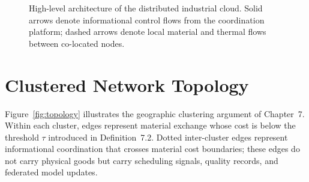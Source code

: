 \documentclass[12pt]{book}
\theoremstyle{definition}
\theoremstyle{remark}
\begin{document}
\begin{figure}[ht]
\centering
{}
\caption{High-level architecture of the distributed industrial cloud.
  Solid arrows denote informational control flows from the coordination
  platform; dashed arrows denote local material and thermal flows
  between co-located nodes.}
\label{fig:architecture}
\end{figure}

\section{Clustered Network Topology}

Figure~\ref{fig:topology} illustrates the geographic clustering
argument of Chapter~7. Within each cluster, edges represent
material exchange whose cost is below the threshold $\tau$ introduced
in Definition~7.2. Dotted inter-cluster edges represent informational
coordination that crosses material cost boundaries; these edges do
not carry physical goods but carry scheduling signals, quality
records, and federated model updates.
\end{document}
